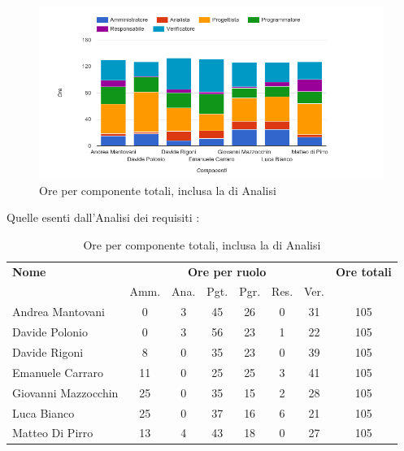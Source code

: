     \begin{figure}[H]
      \begin{center}
        \includegraphics[width=15cm]{res/img/suddivisioneRuoloProspettoOrario/orePerComponenteTotaliConAnalisi.png}
      \caption{Ore per componente totali, inclusa la  di Analisi}
      \end{center} 
    \end{figure}    
    

Quelle esenti dall'Analisi dei requisiti :

\begin{table}[H]
\begin{tabular}{lccccccc}
\toprule
    \textbf{Nome}  & \multicolumn{6}{c}{\textbf{Ore per ruolo}} & \textbf{Ore totali} \\
     & Amm. & Ana. & Pgt. & Pgr. & Res. & Ver. & \\
    \midrule
   
	   Andrea Mantovani & 0 & 3 & 45 & 26 & 0 & 31 & 105 \\
	     Davide Polonio & 0 & 3 & 56 & 23 & 1 & 22 & 105 \\
	      Davide Rigoni & 8 & 0 & 35 & 23 & 0 & 39 & 105 \\
	   Emanuele Carraro & 11 & 0 & 25 & 25 & 3 & 41 & 105 \\
	Giovanni Mazzocchin & 25 & 0 & 35 & 15 & 2 & 28 & 105 \\
	        Luca Bianco & 25 & 0 & 37 & 16 & 6 & 21 & 105 \\
	    Matteo Di Pirro & 13 & 4 & 43 & 18 & 0 & 27 & 105 \\
   
    \bottomrule
\end{tabular}
\caption{Ore per componente totali, inclusa la  di Analisi}
\end{table}

